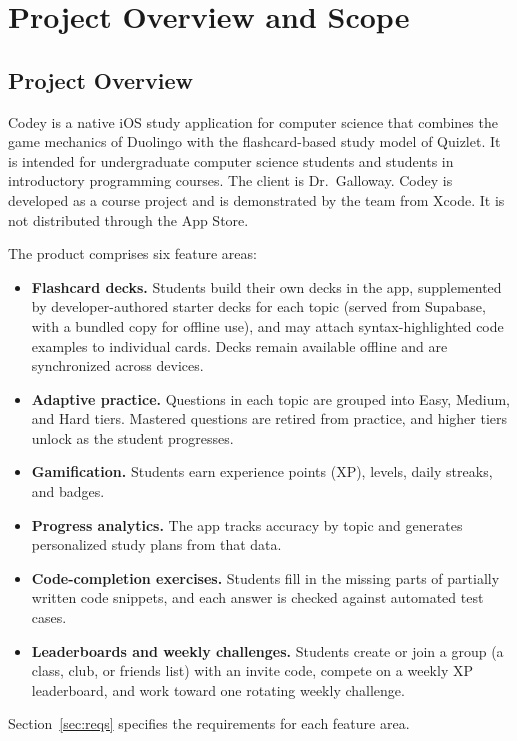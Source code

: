 \documentclass[12pt,letterpaper]{article}
\begin{document}
\section{Project Overview and Scope}

\subsection{Project Overview}
Codey is a native iOS study application for computer science that combines the game
mechanics of Duolingo with the flashcard-based study model of Quizlet. It is intended
for undergraduate computer science students and students in introductory programming
courses. The client is Dr.\ Galloway. Codey is developed as a course project and is
demonstrated by the team from Xcode. It is not distributed through the App Store.

The product comprises six feature areas:
\begin{itemize}
  \item \textbf{Flashcard decks.} Students build their own decks in the app, supplemented by developer-authored starter
        decks for each topic (served from Supabase, with a bundled copy for offline use), and may attach
        syntax-highlighted code examples to individual cards. Decks remain available
        offline and are synchronized across devices.
  \item \textbf{Adaptive practice.} Questions in each topic are grouped into Easy,
        Medium, and Hard tiers. Mastered questions are retired from practice, and
        higher tiers unlock as the student progresses.
  \item \textbf{Gamification.} Students earn experience points (XP), levels, daily
        streaks, and badges.
  \item \textbf{Progress analytics.} The app tracks accuracy by topic and generates
        personalized study plans from that data.
  \item \textbf{Code-completion exercises.} Students fill in the missing parts of
        partially written code snippets, and each answer is checked
        against automated test cases.
  \item \textbf{Leaderboards and weekly challenges.} Students create or join a group
        (a class, club, or friends list) with an invite code, compete on a weekly XP
        leaderboard, and work toward one rotating weekly challenge.
\end{itemize}
Section~\ref{sec:reqs} specifies the requirements for each feature area.
\end{document}
